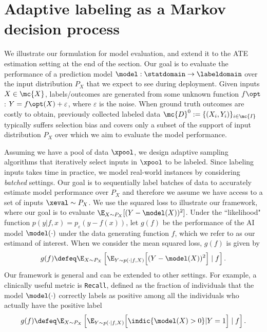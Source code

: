 \section{Adaptive labeling as a Markov decision process} 
\label{sec:formulation}

We illustrate our formulation for model evaluation, and extend it to the ATE estimation setting at the end of the section. 
Our goal is to evaluate the performance of a prediction model $\model: \statdomain \to \mathcal \labeldomain$ over the input distribution $P_X$ that we expect to see during deployment.  Given inputs $X  \in \mc{X}$,   labels/outcomes are generated
 from some unknown function $f\opt$: $
      Y = f\opt(X) + \varepsilon$, where $\varepsilon$ is the noise.
When ground truth outcomes are costly to obtain, previously collected labeled data $\mc{D}^0 := \{(X_i,Y_i)\}_{i \in \mc{I}}$ 
typically suffers selection bias and covers only a subset of the support of input distribution $P_X$ over which we aim to evaluate the model performance. 

Assuming we have a   pool of data $\xpool$, we design
 adaptive sampling algorithms that iteratively select
inputs in $\xpool$ to be labeled.
Since labeling inputs takes time in practice, we model
real-world instances by considering \emph{batched} settings. Our goal is to sequentially label batches of data to accurately estimate model performance over $P_X$ and therefore we assume we have access to a set of inputs $\xeval \sim P_X$. %
We use the squared loss to illustrate our framework,
where our goal is to evaluate $\E_{X \sim P_X}[ (Y - \model(X))^2]$. Under the ``likelihood" function $p(y | f, x) = p_{\varepsilon}(y - f(x))$,  let $g(f)$ be the performance of the AI model $\model(\cdot)$ under the  data generating function $f$, which we refer to as our estimand of interest.
When we consider the mean squared loss,  $g(f)$ is given by 
\begin{align}
    g(f) \defeq \E_{X \sim P_X}\left[ \E_{Y \sim p(\cdot|f,X) } \Big[ (Y - \model(X))^2 \Big] \mid f \right]. \label{eqn:l2-g-f}
\end{align}
Our framework is general and can be extended to other settings. For example, a clinically useful  metric is \texttt{Recall}, defined as the fraction of individuals that the model $\model(\cdot)$ correctly labels as positive  among all the individuals who actually have the positive label 
\begin{align*}
    g(f) \defeq  \E_{X \sim P_X}\left[ \E_{Y \sim p(\cdot|f,X) } \Big[\indic{\model(X)>0}|Y=1\Big] \mid f\right].
\end{align*}
 
